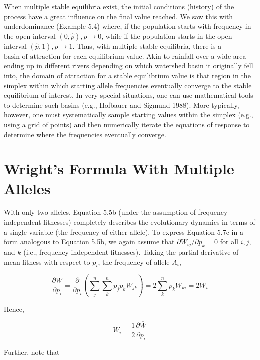 \documentclass{article}
\begin{document}
When multiple stable equilibria exist, the initial conditions (history) of the process have a great influence on the final value reached. We saw this with underdominance (Example 5.4) where, if the population starts with frequency in the open interval  $ (0,\widehat{p}), p \to 0 $, while if the population starts in the open interval  $ (\widehat{p}, 1), p \to 1 $. Thus, with multiple stable equilibria, there is a  $ \text{basin of attraction} $ for each equilibrium value. Akin to rainfall over a wide area ending up in different rivers depending on which watershed basin it originally fell into, the domain of attraction for a stable equilibrium value is that region in the simplex within which starting allele frequencies eventually converge to the stable equilibrium of interest. In very special situations, one can use mathematical tools to determine such basins (e.g., Hofbauer and Sigmund 1988). More typically, however, one must systematically sample starting values within the simplex (e.g., using a grid of points) and then numerically iterate the equations of response to determine where the frequencies eventually converge.

\section{Wright's Formula With Multiple Alleles}
With only two alleles, Equation 5.5b (under the assumption of frequency-independent fitnesses) completely describes the evolutionary dynamics in terms of a single variable (the frequency of either allele). To express Equation 5.7c in a form analogous to Equation 5.5b, we again assume that  $ \partial W_{ij}/\partial p_k = 0 $ for all  $ i,j $, and  $ k $ (i.e., frequency-independent fitnesses). Taking the partial derivative of mean fitness with respect to  $ p_i $, the frequency of allele  $ A_i $,

\begin{equation}
\frac{\partial\overline{W}}{\partial p_{i}}=\frac{\partial}{\partial p_{i}}\left(\sum_{j}^{n}\sum_{k}^{n}p_{j}p_{k}W_{jk}\right)=2\sum_{k}^{n}p_{k}W_{ki}=2W_{i}
\tag{5.9a}
\label{eq:5_9a}
\end{equation}

Hence,

\begin{equation}
W_{i}=\frac{1}{2}\frac{\partial\overline{W}}{\partial p_{i}}
\tag{5.9b}
\label{eq:5_9b}
\end{equation}

Further, note that
\end{document}
